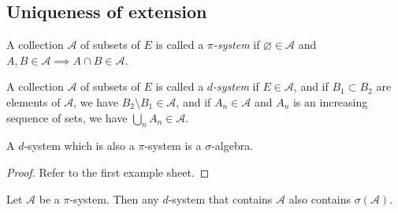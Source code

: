 \subsection{Uniqueness of extension}
\begin{definition}
	A collection \( \mathcal A \) of subsets of \( E \) is called a \emph{\( \pi \)-system} if \( \varnothing \in \mathcal A \) and \( A, B \in \mathcal A \implies A \cap B \in \mathcal A \).
\end{definition}
\begin{definition}
	A collection \( \mathcal A \) of subsets of \( E \) is called a \emph{\( d \)-system} if \( E \in \mathcal A \), and if \( B_1 \subset B_2 \) are elements of \( \mathcal A \), we have \( B_2 \setminus B_1 \in \mathcal A \), and if \( A_n \in \mathcal A \) and \( A_n \) is an increasing sequence of sets, we have \( \bigcup_n A_n \in \mathcal A \).
\end{definition}
\begin{proposition}
	A \( d \)-system which is also a \( \pi \)-system is a \( \sigma \)-algebra.
\end{proposition}
\begin{proof}
	Refer to the first example sheet.
\end{proof}
\begin{lemma}[Dynkin]
	Let \( \mathcal A \) be a \( \pi \)-system.
	Then any \( d \)-system that contains \( \mathcal A \) also contains \( \sigma(\mathcal A) \).
\end{lemma}
